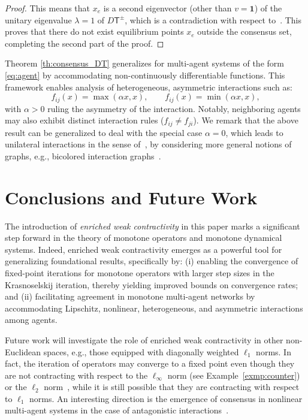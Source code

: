 \documentclass[journal,twoside,web]{ieeecolor}
\newcommand{\Ts}{\mathsf{T}}
\newcommand{\bone}{\boldsymbol{1}}
\begin{document}
\begin{proof}
This means that $x_e$ is a second eigenvector (other than $v=\bone$) of the unitary eigenvalue $\lambda=1$ of $D\Ts^{\pm}$, which is a contradiction with respect to~\cite[Theorem 5.1]{Bullo18}. This proves that there do not exist equilibrium points $x_e$ outside the consensus set, completing the second part of the proof.
%
\end{proof}

Theorem \ref{th:consensus_DT} generalizes \cite[Theorem 6]{Deplano23} for multi-agent systems of the form \eqref{eq:agent} by accommodating non-continuously differentiable functions. This framework enables analysis of heterogeneous, asymmetric interactions such as:
%
$$
f_{ij}(x) = \max(\alpha x,x),\qquad f_{ij}(x) =  \min(\alpha x,x),
$$
%
with $\alpha >0$ ruling the asymmetry of the interaction. 
%
Notably, neighboring agents may also exhibit distinct interaction rules ($f_{ij} \neq f_{ji}$).
%
We remark that the above result can be generalized to deal with the special case $\alpha=0$, which leads to unilateral interactions in the sense of~\cite{manfredi2017necessary}, by considering more general notions of graphs, e.g., bicolored interaction graphs~\cite[Definition 10]{manfredi2017necessary}.

\section{Conclusions and Future Work}
%
The introduction of \textit{enriched weak contractivity} in this paper marks a significant step forward in the theory of monotone operators and monotone dynamical systems.
%
Indeed, enriched weak contractivity emerges as a powerful tool for generalizing foundational results, specifically by: (i) enabling the convergence of fixed-point iterations for monotone operators with larger step sizes in the Krasnoselskij iteration, thereby yielding improved bounds on convergence rates; and (ii) facilitating agreement in monotone multi-agent networks by accommodating Lipschitz, nonlinear, heterogeneous, and asymmetric interactions among agents.

Future work will investigate the role of enriched weak contractivity in other non-Euclidean spaces, e.g., those equipped with diagonally weighted $\ell_1$ norms. In fact, the iteration of operators may converge to a fixed point even though they are not contracting with respect to the $\ell_{\infty}$ norm (see Example~\ref{exmp:counter}) or the $\ell_2$ norm~\cite[Example 9]{bullo2021contraction}, while it is still possible that they are contracting with respect to $\ell_1$ norms. An interesting direction is the emergence of consensus in nonlinear multi-agent systems in the case of antagonistic interactions~\cite{altafini2012consensus}. 
\printbibliography
\end{document}
